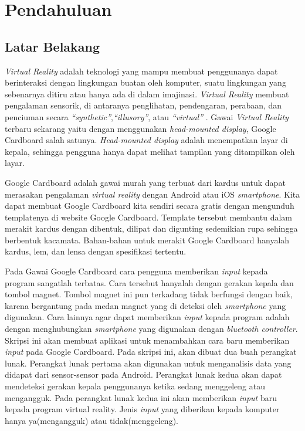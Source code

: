 \chapter{Pendahuluan}
\label{chap:pendahuluan}

\section{Latar Belakang}
\label{sec:latar_belakang}

\textit{Virtual Reality} adalah teknologi yang mampu membuat penggunanya dapat berinteraksi dengan lingkungan buatan oleh komputer, suatu lingkungan yang sebenarnya ditiru atau hanya ada di dalam imajinasi.\cite{parisi_2015} \textit{Virtual Reality} membuat pengalaman sensorik, di antaranya penglihatan, pendengaran, perabaan, dan penciuman secara \textit{"`synthetic"'},\textit{"`illusory"'}, atau \textit{"`virtual"'} .\cite{kim_2005} Gawai \textit{Virtual Reality} terbaru sekarang yaitu dengan menggunakan \textit{head-mounted display}, Google Cardboard salah satunya. \textit{Head-mounted display} adalah menempatkan layar di kepala, sehingga pengguna hanya dapat melihat tampilan yang ditampilkan oleh layar.\cite{vince_2004}

Google Cardboard\cite{googlevr} adalah gawai murah yang terbuat dari kardus untuk dapat merasakan pengalaman \textit{virtual reality} dengan Android atau iOS \textit{smartphone}. Kita dapat membuat Google Cardboard kita sendiri secara gratis dengan mengunduh templatenya di website Google Cardboard. Template tersebut membantu dalam merakit kardus dengan dibentuk, dilipat dan digunting sedemikian rupa sehingga berbentuk kacamata. Bahan-bahan untuk merakit Google Cardboard hanyalah kardus, lem, dan lensa dengan spesifikasi tertentu.

Pada Gawai Google Cardboard cara pengguna memberikan \textit{input} kepada program sangatlah terbatas. Cara tersebut hanyalah dengan gerakan kepala dan tombol magnet. Tombol magnet ini pun terkadang tidak berfungsi dengan baik, karena bergantung pada medan magnet yang di deteksi oleh \textit{smartphone} yang digunakan. Cara lainnya agar dapat memberikan \textit{input} kepada program adalah dengan menghubungkan \textit{smartphone} yang digunakan dengan \textit{bluetooth controller}. 
Skripsi ini akan membuat aplikasi untuk menambahkan cara baru  memberikan \textit{input} pada Google Cardboard. Pada skripsi ini, akan dibuat dua buah perangkat lunak. Perangkat lunak pertama akan digunakan untuk menganalisis data yang didapat dari sensor-sensor pada Android. Perangkat lunak kedua akan dapat mendeteksi gerakan kepala penggunanya ketika sedang menggeleng atau mengangguk. Pada perangkat lunak kedua ini akan memberikan \textit{input} baru kepada program virtual reality. Jenis \textit{input} yang diberikan kepada komputer hanya ya(mengangguk) atau tidak(menggeleng).

